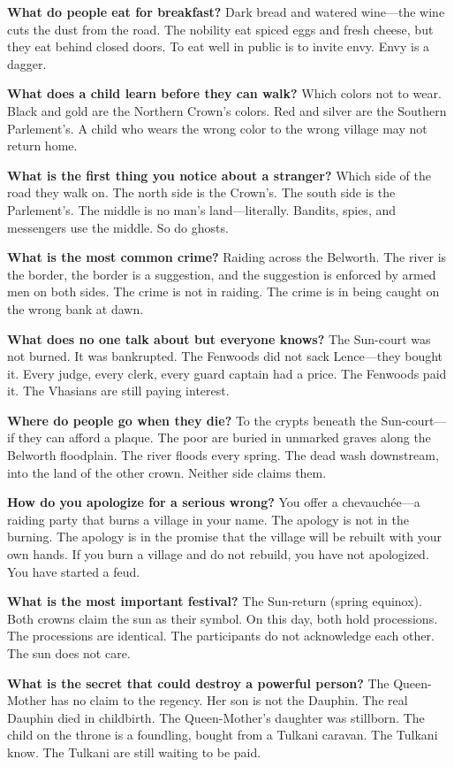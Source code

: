 \begin{almanac}
\textbf{What do people eat for breakfast?} Dark bread and watered wine---the wine cuts the dust from the road. The nobility eat spiced eggs and fresh cheese, but they eat behind closed doors. To eat well in public is to invite envy. Envy is a dagger.

\textbf{What does a child learn before they can walk?} Which colors not to wear. Black and gold are the Northern Crown's colors. Red and silver are the Southern Parlement's. A child who wears the wrong color to the wrong village may not return home.

\textbf{What is the first thing you notice about a stranger?} Which side of the road they walk on. The north side is the Crown's. The south side is the Parlement's. The middle is no man's land---literally. Bandits, spies, and messengers use the middle. So do ghosts.

\textbf{What is the most common crime?} Raiding across the Belworth. The river is the border, the border is a suggestion, and the suggestion is enforced by armed men on both sides. The crime is not in raiding. The crime is in being caught on the wrong bank at dawn.

\textbf{What does no one talk about but everyone knows?} The Sun-court was not burned. It was bankrupted. The Fenwoods did not sack Lence---they bought it. Every judge, every clerk, every guard captain had a price. The Fenwoods paid it. The Vhasians are still paying interest.

\textbf{Where do people go when they die?} To the crypts beneath the Sun-court---if they can afford a plaque. The poor are buried in unmarked graves along the Belworth floodplain. The river floods every spring. The dead wash downstream, into the land of the other crown. Neither side claims them.

\textbf{How do you apologize for a serious wrong?} You offer a chevauchée---a raiding party that burns a village in your name. The apology is not in the burning. The apology is in the promise that the village will be rebuilt with your own hands. If you burn a village and do not rebuild, you have not apologized. You have started a feud.

\textbf{What is the most important festival?} The Sun-return (spring equinox). Both crowns claim the sun as their symbol. On this day, both hold processions. The processions are identical. The participants do not acknowledge each other. The sun does not care.

\textbf{What is the secret that could destroy a powerful person?} The Queen-Mother has no claim to the regency. Her son is not the Dauphin. The real Dauphin died in childbirth. The Queen-Mother's daughter was stillborn. The child on the throne is a foundling, bought from a Tulkani caravan. The Tulkani know. The Tulkani are still waiting to be paid.
\end{almanac}

